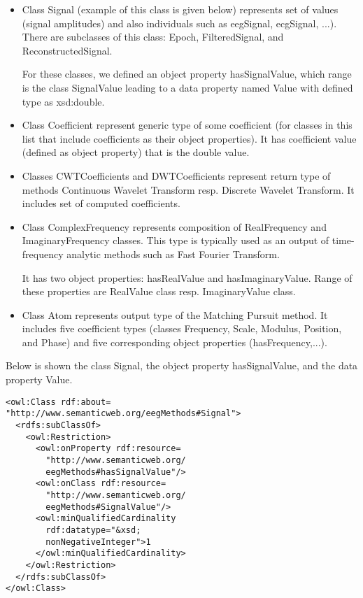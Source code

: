 \documentclass[a4paper,twoside]{article}
\begin{document}
\begin{itemize}
\item Class Signal (example of this class is given below) represents set of values (signal amplitudes) and also individuals such as eegSignal, ecgSignal, ...). There are subclasses of this class: Epoch, FilteredSignal, and ReconstructedSignal.

For these classes, we defined an object property hasSignalValue, which range is the class SignalValue leading to a data property named Value with defined type as xsd:double.

\item Class Coefficient represent generic type of some coefficient (for classes in this list that include coefficients as their object properties). It has coefficient value (defined as object property) that is the double value.

\item Classes CWTCoefficients and DWTCoefficients represent return type of methods Continuous Wavelet Transform resp. Discrete Wavelet Transform. It includes set of computed coefficients.

\item Class ComplexFrequency represents composition of RealFrequency and ImaginaryFrequency classes. This type is typically used as an output of time-frequency analytic methods such as Fast Fourier Transform.

It has two object properties: hasRealValue and hasImaginaryValue. Range of these properties are RealValue class resp. ImaginaryValue class.

\item Class Atom represents output type of the Matching Pursuit method. It includes five coefficient types (classes Frequency, Scale, Modulus, Position, and Phase) and five corresponding object properties (hasFrequency,...).
\end{itemize}

Below is shown the class Signal, the object property hasSignalValue, and the data property Value.

\begin{small}
\begin{verbatim}
<owl:Class rdf:about=
"http://www.semanticweb.org/eegMethods#Signal">
  <rdfs:subClassOf>
    <owl:Restriction>
      <owl:onProperty rdf:resource=
        "http://www.semanticweb.org/
        eegMethods#hasSignalValue"/>
      <owl:onClass rdf:resource=
        "http://www.semanticweb.org/
        eegMethods#SignalValue"/>
      <owl:minQualifiedCardinality
        rdf:datatype="&xsd;
        nonNegativeInteger">1
      </owl:minQualifiedCardinality>
    </owl:Restriction>
  </rdfs:subClassOf>
</owl:Class>
\end{verbatim}
\end{small}
\end{document}
